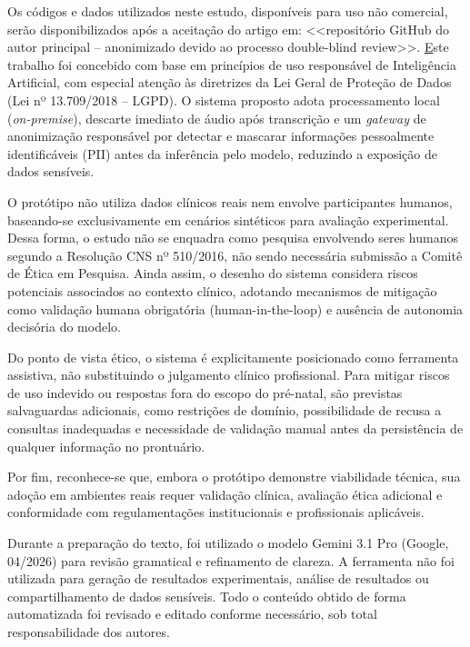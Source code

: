 Os códigos e dados utilizados neste estudo, disponíveis para uso não comercial, serão disponibilizados após a aceitação do artigo em: <<repositório GitHub do autor principal -- anonimizado devido ao processo double-blind review>>. 
\href{https://github.com/lucaszegrine/sus-prenatal-ai-icei-puc-minas-cc}%


Este trabalho foi concebido com base em princípios de uso responsável de Inteligência Artificial, com especial atenção às diretrizes da Lei Geral de Proteção de Dados (Lei nº 13.709/2018 – LGPD). O sistema proposto adota processamento local (\textit{on-premise}), descarte imediato de áudio após transcrição e um \textit{gateway} de anonimização responsável por detectar e mascarar informações pessoalmente identificáveis (PII) antes da inferência pelo modelo, reduzindo a exposição de dados sensíveis.

O protótipo não utiliza dados clínicos reais nem envolve participantes humanos, baseando-se exclusivamente em cenários sintéticos para avaliação experimental. Dessa forma, o estudo não se enquadra como pesquisa envolvendo seres humanos segundo a Resolução CNS nº 510/2016, não sendo necessária submissão a Comitê de Ética em Pesquisa. Ainda assim, o desenho do sistema considera riscos potenciais associados ao contexto clínico, adotando mecanismos de mitigação como validação humana obrigatória (human-in-the-loop) e ausência de autonomia decisória do modelo.

Do ponto de vista ético, o sistema é explicitamente posicionado como ferramenta assistiva, não substituindo o julgamento clínico profissional. Para mitigar riscos de uso indevido ou respostas fora do escopo do pré-natal, são previstas salvaguardas adicionais, como restrições de domínio, possibilidade de recusa a consultas inadequadas e necessidade de validação manual antes da persistência de qualquer informação no prontuário.

Por fim, reconhece-se que, embora o protótipo demonstre viabilidade técnica, sua adoção em ambientes reais requer validação clínica, avaliação ética adicional e conformidade com regulamentações institucionais e profissionais aplicáveis.

Durante a preparação do texto, foi utilizado o modelo Gemini 3.1 Pro (Google, 04/2026) para revisão gramatical e refinamento de clareza.
A ferramenta não foi utilizada para geração de resultados experimentais, análise de resultados ou compartilhamento de dados sensíveis.
Todo o conteúdo obtido de forma automatizada foi revisado e editado conforme necessário, sob total responsabilidade dos autores.
